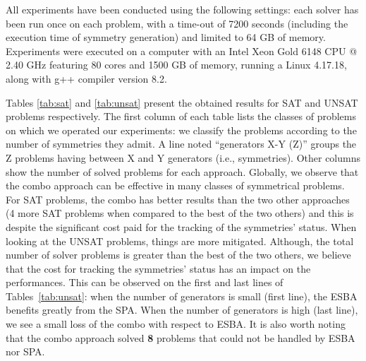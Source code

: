 All experiments have been conducted using the following settings: each solver
has been run once on each problem, with a time-out of 7200 seconds (including
the execution time of symmetry generation) and limited to 64 GB of memory.
Experiments were executed on a computer with an Intel Xeon Gold 6148 CPU
@ 2.40 GHz featuring 80 cores and 1500 GB of memory, running a Linux 4.17.18,
along with g++ compiler version 8.2.

Tables \ref{tab:sat} and \ref{tab:unsat} present the obtained results for SAT
and UNSAT problems respectively. The first column of each table lists the
classes of problems on which we operated our experiments: we classify the
problems according to the number of symmetries they admit. A line noted
``generators X-Y (Z)'' groups the Z problems having between X and Y generators
(i.e., symmetries). Other columns show the number of solved problems for each
approach.
Globally, we observe that the combo approach can be effective in many classes
of symmetrical problems. For SAT problems, the combo has better results than the
two other approaches (4 more SAT problems when compared to the best of the two
others) and this is despite the significant cost paid for the tracking of the
symmetries' status. When looking at the UNSAT problems, things are more
mitigated. Although, the total number of solver problems is greater than the
best of the two others, we believe that the cost for tracking the symmetries'
status has an impact on the performances. This can be observed on the first and
last lines of Tables~\ref{tab:unsat}: when the number of generators is small
(first line), the ESBA benefits greatly from the SPA. When the number of
generators is high (last line), we see a small loss of the combo with respect
to ESBA. It is also worth noting that the combo approach solved \textbf{8} problems 
that could not be handled by ESBA nor SPA.
\begin{table}[!htbp]
 \begin{center}
 \end{center}
 \caption{Comparison of PAR-2 and CTI times (in seconds) of the global solving.}
 \label{tab:global}
\end{table}

